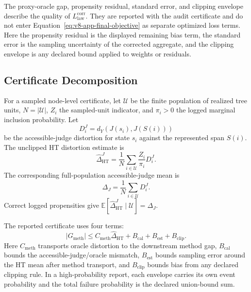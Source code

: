 The proxy-oracle gap, propensity residual, standard error, and clipping
envelope describe the quality of \(L_{\mathrm{law}}^{\mathrm{corr}}\). They are
reported with the audit certificate and do not enter
Equation~\eqref{eq:v8-app-final-objective} as separate optimized loss terms.
Here the propensity residual is the displayed remaining bias term, the standard
error is the sampling uncertainty of the corrected aggregate, and the clipping
envelope is any declared bound applied to weights or residuals.

\subsection{Certificate Decomposition}
\label{app:v8-certificate-decomposition}

For a sampled node-level certificate, let \(\mathcal U\) be the finite
population of realized tree units, \(N=|\mathcal U|\), \(Z_i\) the sampled-unit
indicator, and \(\pi_i>0\) the logged marginal inclusion probability. Let
\[
  D_i^J=d_Y(J(s_i),J(S(i)))
\]
be the accessible-judge distortion for state \(s_i\) against the represented
span \(S(i)\). The unclipped HT distortion estimate is
\[
  \widehat{\Delta}_{\mathrm{HT}}^J
  =
  \frac{1}{N}
  \sum_{i\in\mathcal U}
  \frac{Z_i}{\pi_i}D_i^J .
\]
The corresponding full-population accessible-judge mean is
\[
  \Delta_J
  =
  \frac{1}{N}\sum_{i\in\mathcal U}D_i^J .
\]
Correct logged propensities give
\(\mathbb E[\widehat{\Delta}_{\mathrm{HT}}^J\mid\mathcal U]=\Delta_J\).

The reported certificate uses four terms:
\[
  |G_{\mathrm{meth}}|
  \le
  C_{\mathrm{meth}}\widehat{\Delta}_{\mathrm{HT}}
  +
  B_{\mathrm{cal}}
  +
  B_{\mathrm{est}}
  +
  B_{\mathrm{clip}} .
\]
Here \(C_{\mathrm{meth}}\) transports oracle distortion to the downstream
method gap, \(B_{\mathrm{cal}}\) bounds the accessible-judge/oracle mismatch,
\(B_{\mathrm{est}}\) bounds sampling error around the HT mean after method
transport, and \(B_{\mathrm{clip}}\) bounds bias from any declared clipping
rule. In a high-probability report, each envelope carries its own event
probability and the total failure probability is the declared union-bound
sum.

